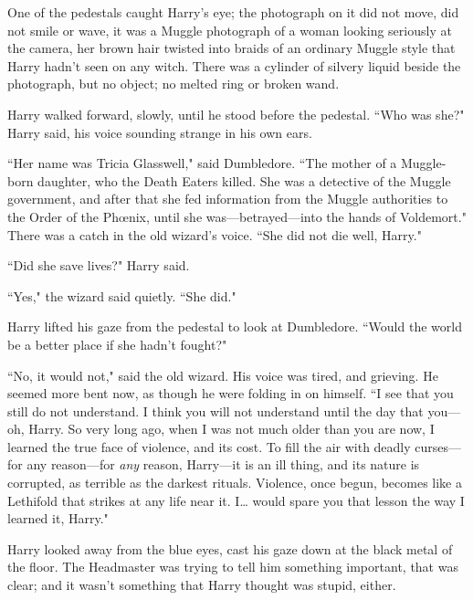 One of the pedestals caught Harry's eye; the photograph on it did not move, did not smile or wave, it was a Muggle photograph of a woman looking seriously at the camera, her brown hair twisted into braids of an ordinary Muggle style that Harry hadn't seen on any witch. There was a cylinder of silvery liquid beside the photograph, but no object; no melted ring or broken wand.

Harry walked forward, slowly, until he stood before the pedestal. ``Who was she?" Harry said, his voice sounding strange in his own ears.

``Her name was Tricia Glasswell," said Dumbledore. ``The mother of a Muggle-born daughter, who the Death Eaters killed. She was a detective of the Muggle government, and after that she fed information from the Muggle authorities to the Order of the Phœnix, until she was—betrayed—into the hands of Voldemort." There was a catch in the old wizard's voice. ``She did not die well, Harry."

``Did she save lives?" Harry said.

``Yes," the wizard said quietly. ``She did."

Harry lifted his gaze from the pedestal to look at Dumbledore. ``Would the world be a better place if she hadn't fought?"

``No, it would not," said the old wizard. His voice was tired, and grieving. He seemed more bent now, as though he were folding in on himself. ``I see that you still do not understand. I think you will not understand until the day that you—oh, Harry. So very long ago, when I was not much older than you are now, I learned the true face of violence, and its cost. To fill the air with deadly curses—for any reason—for \emph{any} reason, Harry—it is an ill thing, and its nature is corrupted, as terrible as the darkest rituals. Violence, once begun, becomes like a Lethifold that strikes at any life near it. I{\ldots} would spare you that lesson the way I learned it, Harry."

Harry looked away from the blue eyes, cast his gaze down at the black metal of the floor. The Headmaster was trying to tell him something important, that was clear; and it wasn't something that Harry thought was stupid, either.

